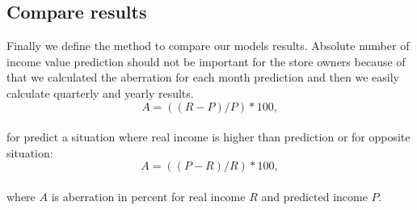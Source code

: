 \subsection{Compare results} \label{subsec:matlab}
Finally we define the method to compare our models results.
Absolute number of income value prediction should not be important for the store owners because of that we calculated the aberration for each month
prediction and then we easily calculate quarterly and yearly results.
\begin{equation} \label{eq:42}
A = ((R - P)/P) * 100,
\end{equation}\\
for predict a situation where real income is higher than prediction or for opposite situation:
\begin{equation} \label{eq:43}
A = ((P - R)/R) * 100,
\end{equation}\\
where $A$ is aberration in percent for real income $R$ and predicted income $P$.
